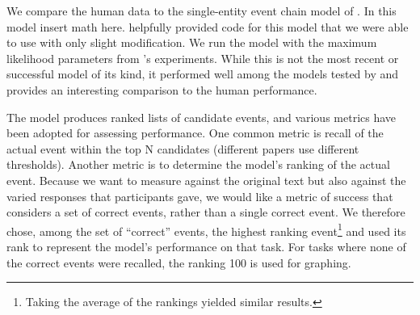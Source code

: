\documentclass[10pt,a4paper]{article}
\newcommand{\todo}[1]{{\color{red}#1}}
\begin{document}
We compare the human data to the single-entity event chain model of . In this model \todo{insert math here}.
 helpfully provided code for this model that we were able to use with only slight modification.
We run the model with the maximum likelihood parameters from 's experiments.
While this is not the most recent or successful model of its kind, it performed well among the models tested by  and provides an interesting comparison to the human performance.

The model produces ranked lists of candidate events, and various metrics have been adopted for assessing performance.
One common metric is recall of the actual event within the top N candidates (different papers use different thresholds). Another metric is to determine the model's ranking of the actual event. Because we want to measure against the original text but also against the varied responses that participants gave, we would like a metric of success that considers a set of correct events, rather than a single correct event. We therefore chose, among the set of ``correct'' events, the highest ranking event\footnote{Taking the average of the rankings yielded similar results.} and used its rank to represent the model's performance on that task. For tasks where none of the correct events were recalled, the ranking 100 is used for graphing.
\end{document}
